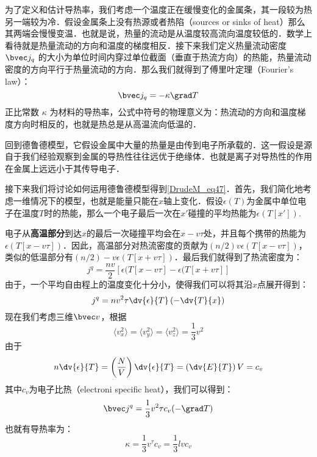 为了定义和估计导热率，我们考虑一个温度正在缓慢变化的金属条，其一段较为热另一端较为冷．假设金属条上没有热源或者热陷（sources or sinks of heat）那么其两端会慢慢变温．也就是说，热量的流动是从温度较高流向温度较低的．数学上看待就是热量流动的方向和温度的梯度相反．接下来我们定义热量流动密度 $\bvec j_q$ 的大小为单位时间内穿过单位截面（垂直于热流方向）的热能，热量流动密度的方向平行于热量流动的方向．那么我们就得到了傅里叶定理（Fourier's law）：
\begin{equation}
\bvec j_q =-\kappa\grad T
\end{equation}
正比常数 $\kappa$ 为材料的导热率，公式中符号的物理意义为：热流动的方向和温度梯度方向时相反的，也就是热总是从高温流向低温的．

回到德鲁德模型，它假设金属中大量的热量是由传到电子所承载的．这一假设是源自于我们经验观察到金属的导热性往往远优于绝缘体．也就是离子对导热性的作用在金属上远远小于其传导电子．

接下来我们将讨论如何运用德鲁德模型得到\autoref{DrudeM_eq47}．首先，我们简化地考虑一维情况下的模型，也就是能量只能在$x$轴上变化．假设$\epsilon(T)$为金属中单位电子在温度$T$时的热能，那么一个电子最后一次在$x'$碰撞的平均热能为$\epsilon(T[x'])$.

电子从\textbf{高温部分}到达$x$的最后一次碰撞平均会在$x-v\tau$处，并且每个携带的热能为$\epsilon(T[x-v\tau])$．因此，高温部分对热流密度的贡献为$(n/2)v\epsilon(T[x-v\tau])$，类似的低温部分有$(n/2)-v\epsilon(T[x+v\tau])$．最后我们就得到了热流密度为：
\begin{equation}
j^q = \frac{nv}{2}[\epsilon(T[x-v\tau]-\epsilon(T[x+v\tau]]
\end{equation}
由于，一个平均自由程上的温度变化十分小，使得我们可以将其沿$x$点展开得到：
\begin{equation}
j^q = nv^2\tau\dv{\epsilon}{T}\left(-\dv{T}{x}\right)
\end{equation}
现在我们考虑三维$\bvec v$，根据
\begin{equation}
\langle v_x^2\rangle = \langle v_y^2\rangle=\langle v_z^2 \rangle = \frac{1}{3}v^2
\end{equation}
由于
\begin{equation}
n\dv{\epsilon}{T}=\left(\frac{N}{V}\right)\dv{\epsilon}{T}=\left(\dv{E}{T}\right)V=c_v
\end{equation}
其中$c_v$为电子比热（electroni specific heat），我们可以得到：
\begin{equation}
\bvec j^q =\frac{1}{3}v^2\tau c_v(-\grad T)
\end{equation}
也就有导热率为：
\begin{equation}
\kappa=\frac{1}{3}v^\tau c_v =\frac{1}{3}lvc_v
\end{equation}




